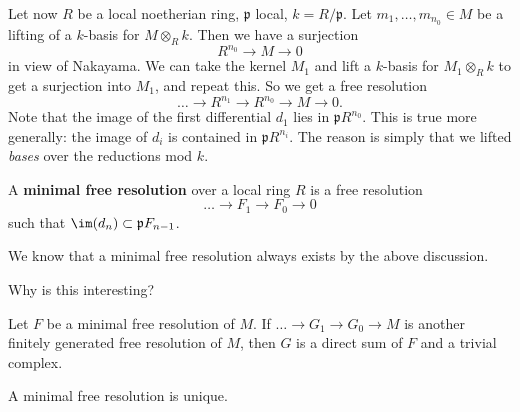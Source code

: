 Let now $R$ be a local noetherian ring, $\mathfrak{p}$ local, $k =
R/\mathfrak{p}$.  Let $m_1, \dots, m_{n_0} \in M$ be a lifting of a $k$-basis for
$M \otimes_R k$. Then we have a surjection 
\[ R^{n_0} \to M \to 0  \]
in view of Nakayama. We can take the kernel $M_1$ and lift a $k$-basis for $M_1
\otimes_R k$ to get a surjection into $M_1$, and repeat this. So we get a free
resolution
\[ \dots \to R^{n_1} \to R^{n_0} \to M \to 0.  \]
Note that the image of the first differential $d_1$ lies in $\mathfrak{p}
R^{n_0}$. This is true more generally: the image of $d_i$ is contained in
$\mathfrak{p}R^{n_i}$.
The reason is simply that we lifted \emph{bases} over the reductions mod $k$.
\begin{definition} 
A \textbf{minimal free resolution}  over a local ring $R$ is a free resolution
\[  \dots \to F_1 \to F_0 \to 0  \]
such that $\im(d_n) \subset \mathfrak{p}F_{n-1}$.

\end{definition} 
We know that a minimal free resolution always exists by the above discussion.

Why is this interesting?


\begin{theorem} Let $F$ be a minimal free resolution of $M$.
If $\dots \to G_1 \to G_0 \to M$ is another finitely generated free resolution of $M$, then $G$ is
a direct sum of $F$ and a trivial complex.
\end{theorem} 

\begin{corollary} 
A minimal free resolution is unique.
\end{corollary} 

